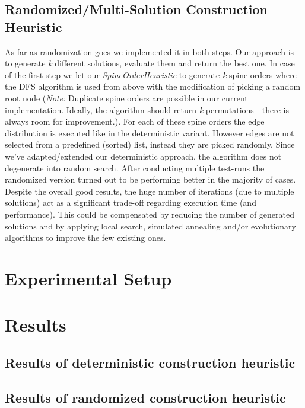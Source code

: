 \documentclass[11pt]{article}
\begin{document}
\subsection{Randomized/Multi-Solution Construction Heuristic}
As far as randomization goes we implemented it in both steps. Our approach is to generate \textit{k} different solutions, evaluate them and return the best one. In case of the first step we let our \textit{SpineOrderHeuristic} to generate \textit{k} spine orders where the DFS algorithm is used from above with the modification of picking a random root node (\textit{Note:} Duplicate spine orders are possible in our current implementation. Ideally, the algorithm should return \textit{k} permutations - there is always room for improvement.). For each of these spine orders the edge distribution is executed like in the deterministic variant. However edges are not selected from a predefined (sorted) list, instead they are picked randomly. Since we've adapted/extended our deterministic approach, the algorithm does not degenerate into random search. After conducting multiple test-runs the randomized version turned out to be performing better in the majority of cases. Despite the overall good results, the huge number of iterations (due to multiple solutions) act as a significant trade-off regarding execution time (and performance). This could be compensated by reducing the number of generated solutions and by applying local search, simulated annealing and/or evolutionary algorithms to improve the few existing ones.

\section{Experimental Setup}

\newpage
\section{Results}
\subsection{Results of deterministic construction heuristic}
{
\center

}

\subsection{Results of randomized construction heuristic}
{
\center

}
\end{document}
